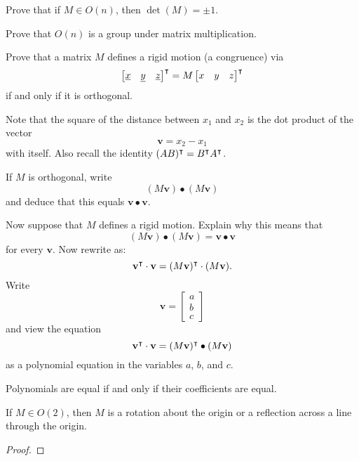 \documentclass{ximera}
\begin{document}
\begin{exercise}
  Prove that if $M\in O(n)$, then $\det(M) = \pm 1$.
\end{exercise}


\begin{exercise}
  Prove that $O(n)$ is a group under matrix multiplication.
\end{exercise}




\begin{exercise}
  Prove that a matrix $ M$ defines a rigid motion (a congruence)
  via
  \[
  \begin{bmatrix}
    \underline{x} & \underline{y} & \underline{z}%
  \end{bmatrix}^\transpose
  = M \begin{bmatrix} x & y & z\end{bmatrix}^\transpose
  \]
  if and only if it is orthogonal.

  \begin{hint}
    Note that the square of the distance between $x_{1}$ and
    $x_{2}$ is the dot product of the vector%
    \[
    {\mathbf v}=x_{2}-x_{1}%
    \]
    with itself.  Also recall the identity $(AB)^\intercal=B^\intercal A^\intercal$.
  \end{hint}
  \begin{hint}
    If $ M$ is orthogonal, write
    \[
    ( M{\mathbf v}) \bullet ( M{\mathbf v})
    \]
    and deduce that this equals ${\mathbf v}\bullet{\mathbf v}$. 
  \end{hint}
  \begin{hint}
    Now suppose that $ M$ defines a rigid motion. Explain why this means
    that
    \[
    ( M{\mathbf v}) \bullet ( M{\mathbf v})=
    {\mathbf v} \bullet {\mathbf v}
    \]
    for every ${\mathbf v}$.  Now rewrite as:
    \[
    {\mathbf v}^\intercal \cdot{\mathbf v}
    =( M{\mathbf v})^\intercal \cdot ( M{\mathbf v}).
    \]
    Write
    \[
    {\mathbf v} =
    \begin{bmatrix}
      a \\ b \\ c
    \end{bmatrix}
    \]
     and view the equation 
    \[
    {\mathbf v}^\intercal \cdot{\mathbf v}
    =( M{\mathbf v})^\intercal \bullet ( M{\mathbf v})
    \]
    as a polynomial equation in the variables $a$, $b$, and $c$. 
  \end{hint}
  \begin{hint}
    Polynomials are equal if and only if their coefficients are equal. 
  \end{hint}
\end{exercise}


\begin{theorem}
  If $M\in O(2)$, then $M$ is a rotation about the origin or a
  reflection across a line through the origin.
  \begin{proof}
  \end{proof}
\end{theorem}
\end{document}
